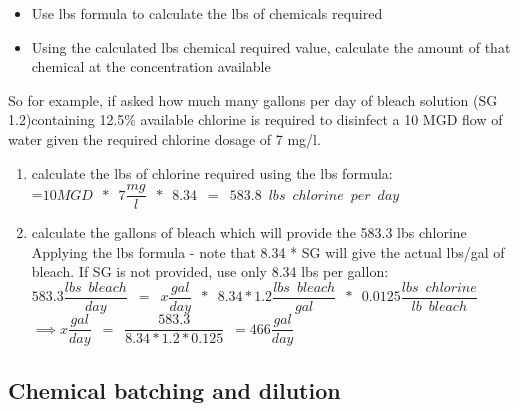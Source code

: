 \begin{itemize}
\item Use lbs formula to calculate the lbs of chemicals required\\
\item Using the calculated lbs chemical required value, calculate the amount of that chemical at the concentration available
\end{itemize}

So for example, if asked how much many gallons per day of bleach solution (SG 1.2)containing 12.5\% available chlorine is required to disinfect a 10 MGD flow of water given the required chlorine dosage of 7 mg/l.\\
\begin{enumerate}
\item calculate the lbs of chlorine required using the lbs formula:\\
\vspace{0.5cm}
=$10 MGD \enspace * \enspace 7 \dfrac{mg}{l} \enspace * \enspace 8.34\enspace=\enspace 583.8 \enspace lbs \enspace chlorine \enspace per \enspace day$\\
\vspace{0.5cm}
\item calculate the gallons of bleach which will provide the 583.3 lbs chlorine\\
\vspace{0.5cm}
Applying the lbs formula - note that 8.34 * SG will give the actual lbs/gal of bleach.  If SG is not provided, use only 8.34 lbs per gallon:\\
\vspace{0.5cm}
$583.3 \dfrac{lbs \enspace bleach}{day}\enspace=\enspace x \dfrac{gal}{day} \enspace * \enspace 8.34 * 1.2 \dfrac{lbs \enspace bleach}{gal} \enspace * \enspace 0.0125 \dfrac{lbs \enspace chlorine}{lb \enspace bleach} \enspace $\\
\vspace{0.5cm}
$ \implies x \dfrac{gal}{day}\enspace = \enspace \dfrac{583.3}{8.34*1.2*0.125} \enspace = \boxed{466 \dfrac{gal}{day}}$
\end{enumerate}

\subsection{Chemical batching and dilution}

